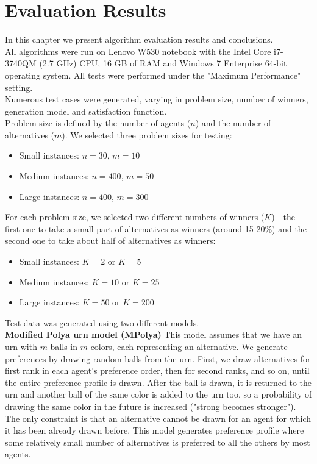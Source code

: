 \chapter{Evaluation Results}
\label{cha:evaluationResults}

In this chapter we present algorithm evaluation results and conclusions.
\\

All algorithms were run on Lenovo W530 notebook with the Intel Core i7-3740QM (2.7 GHz) CPU, 16 GB of RAM and Windows 7 Enterprise 64-bit operating system. All tests were performed under the "Maximum Performance" setting.
\\

Numerous test cases were generated, varying in problem size, number of winners, generation model and satisfaction function.
\\

Problem size is defined by the number of agents ($n$) and the number of alternatives ($m$). We selected three problem sizes for testing:
\begin{itemize}
	\item Small instances: $n = 30$, $m = 10$
	\item Medium instances: $n = 400$, $m = 50$
	\item Large instances: $n = 400$, $m = 300$
\end{itemize}
\vspace{16pt}

For each problem size, we selected two different numbers of winners ($K$) - the first one to take a small part of alternatives as winners (around 15-20\%) and the second one to take about half of alternatives as winners:
\begin{itemize}
	\item Small instances: $K = 2$ or $K = 5$
	\item Medium instances: $K = 10$ or $K = 25$
	\item Large instances: $K = 50$ or $K = 200$
\end{itemize}
\vspace{16pt}

Test data was generated using two different models.
\\

\noindent
\textbf{Modified Polya urn model (MPolya)} \hspace{.1in} This model assumes that we have an urn with $m$ balls in $m$ colors, each representing an alternative. We generate preferences by drawing random balls from the urn. First, we draw alternatives for first rank in each agent's preference order, then for second ranks, and so on, until the entire preference profile is drawn. After the ball is drawn, it is returned to the urn and another ball of the same color is added to the urn too, so a probability of drawing the same color in the future is increased ("strong becomes stronger"). The only constraint is that an alternative cannot be drawn for an agent for which it has been already drawn before. This model generates preference profile where some relatively small number of alternatives is preferred to all the others by most agents.
\\


